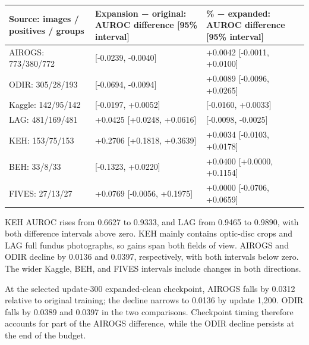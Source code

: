 \documentclass[
  10pt,
]{article}
\begin{document}
\begin{longtable}[]{@{}
  >{\raggedright\arraybackslash}p{}
  >{\raggedleft\arraybackslash}p{}
  >{\raggedleft\arraybackslash}p{}@{}}
\toprule\noalign{}
\begin{minipage}[b]{\linewidth}\raggedright
Source: images / positives / groups
\end{minipage} & \begin{minipage}[b]{\linewidth}\raggedleft
Expansion − original: AUROC difference {[}95\% interval{]}
\end{minipage} & \begin{minipage}[b]{\linewidth}\raggedleft
50\% − expanded: AUROC difference {[}95\% interval{]}
\end{minipage} \\
\midrule\noalign{}
\endhead
\bottomrule\noalign{}
\endlastfoot
AIROGS: 773/380/772 & -0.0136 {[}-0.0239, -0.0040{]} & +0.0042
{[}-0.0011, +0.0100{]} \\
ODIR: 305/28/193 & -0.0397 {[}-0.0694, -0.0094{]} & +0.0089 {[}-0.0096,
+0.0265{]} \\
Kaggle: 142/95/142 & -0.0058 {[}-0.0197, +0.0052{]} & -0.0054
{[}-0.0160, +0.0033{]} \\
LAG: 481/169/481 & +0.0425 {[}+0.0248, +0.0616{]} & -0.0058 {[}-0.0098,
-0.0025{]} \\
KEH: 153/75/153 & +0.2706 {[}+0.1818, +0.3639{]} & +0.0034 {[}-0.0103,
+0.0178{]} \\
BEH: 33/8/33 & -0.0400 {[}-0.1323, +0.0220{]} & +0.0400 {[}+0.0000,
+0.1154{]} \\
FIVES: 27/13/27 & +0.0769 {[}-0.0056, +0.1975{]} & +0.0000 {[}-0.0706,
+0.0659{]} \\
\end{longtable}

KEH AUROC rises from 0.6627 to 0.9333, and LAG from 0.9465 to 0.9890,
with both difference intervals above zero. KEH mainly contains
optic-disc crops and LAG full fundus photographs, so gains span both
fields of view. AIROGS and ODIR decline by 0.0136 and 0.0397,
respectively, with both intervals below zero. The wider Kaggle, BEH, and
FIVES intervals include changes in both directions.

At the selected update-300 expanded-clean checkpoint, AIROGS falls by
0.0312 relative to original training; the decline narrows to 0.0136 by
update 1,200. ODIR falls by 0.0389 and 0.0397 in the two comparisons.
Checkpoint timing therefore accounts for part of the AIROGS difference,
while the ODIR decline persists at the end of the budget.
\end{document}
